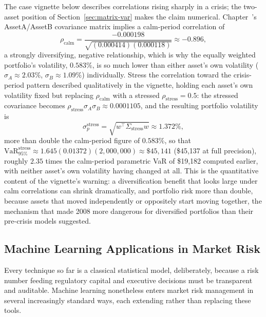 \documentclass[../ai_in_finance]{subfiles}
\begin{document}
The case vignette below describes correlations rising sharply in a crisis; the two-asset position of Section~\ref{sec:matrix-var} makes the claim numerical. Chapter~'s AssetA/AssetB covariance matrix implies a calm-period correlation of
\begin{equation*}
\rho_{\text{calm}} = \frac{-0.000198}{\sqrt{(0.000414)(0.000118)}} \approx -0.896,
\end{equation*}
a strongly diversifying, negative relationship, which is why the equally weighted portfolio's volatility, $0.583\%$, is so much lower than either asset's own volatility ($\sigma_A \approx 2.03\%$, $\sigma_B \approx 1.09\%$) individually. Stress the correlation toward the crisis-period pattern described qualitatively in the vignette, holding each asset's own volatility fixed but replacing $\rho_{\text{calm}}$ with a stressed $\rho_{\text{stress}} = 0.5$: the stressed covariance becomes $\rho_{\text{stress}}\sigma_A\sigma_B \approx 0.0001105$, and the resulting portfolio volatility is
\begin{equation*}
\sigma_p^{\text{stress}} = \sqrt{w^\top \Sigma_{\text{stress}} w} \approx 1.372\%,
\end{equation*}
more than double the calm-period figure of $0.583\%$, so that $\text{VaR}_{95\%}^{\text{stress}} \approx 1.645(0.01372)(2{,}000{,}000) \approx \$45{,}141$ (\$45{,}137 at full precision), roughly $2.35$ times the calm-period parametric VaR of \$19,182 computed earlier, with neither asset's own volatility having changed at all.
This is the quantitative content of the vignette's warning: a diversification benefit that looks large under calm correlations can shrink dramatically, and portfolio risk more than double, because assets that moved independently or oppositely start moving together, the mechanism that made 2008 more dangerous for diversified portfolios than their pre-crisis models suggested.

\subsection{Machine Learning Applications in Market Risk}

Every technique so far is a classical statistical model, deliberately, because a risk number feeding regulatory capital and executive decisions must be transparent and auditable. Machine learning nonetheless enters market risk management in several increasingly standard ways, each extending rather than replacing these tools.
\end{document}
